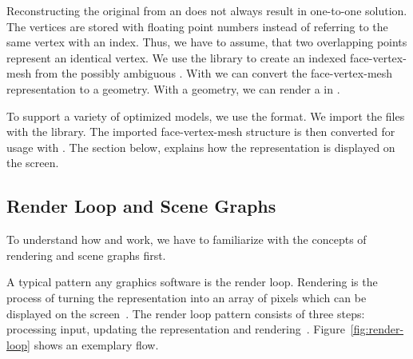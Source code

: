 \documentclass[../ClassicThesis.tex]{subfiles}
\begin{document}

Reconstructing the original {\threedmodel} from an {\stlfile} does not
always result in one-to-one solution. The vertices are stored with
floating point numbers instead of referring to the same vertex with an
index. Thus, we have to assume, that two overlapping points represent
an identical vertex. We use the library {\meshlib} to create an
indexed face-vertex-mesh from the possibly ambiguous {\stlfile}. With
{\meshlib} we can convert the face-vertex-mesh representation to a
{\threejs} geometry. With a {\threejs} geometry, we can render a
{\threedmodel} in {\convertify}.


To support a variety of {\threedprinter} optimized models, we use the
{\stlfile} format. We import the files with the {\meshlib} library.
The imported face-vertex-mesh structure is then converted for usage
with {\threejs}. The section below, explains how the {\threejs}
representation is displayed on the screen.

\subsection{Render Loop and Scene Graphs}
\label{sub:render-and-graph}

To understand how {\convertify} and {\platener} work, we have to
familiarize with the concepts of rendering and scene graphs first.

A typical pattern any graphics software is the
render loop. Rendering is the process of turning the {\threedmodel}
representation into an array of pixels which can be displayed on the
screen~\cite[p.~2]{intro-cg}. The render loop pattern consists of
three steps: processing input, updating the {\threedmodel}
representation and rendering~\cite{gamedev-gameloop}.
Figure~\ref{fig:render-loop} shows an exemplary flow.
\end{document}
